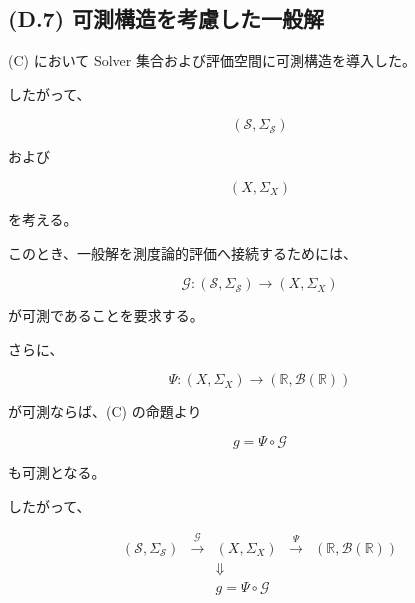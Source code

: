 \documentclass[a4paper,11pt]{article}
\newcommand{\Solver}{\mathcal{S}}
\newcommand{\R}{\mathbb{R}}
\begin{document}
\subsection{(D.7) 可測構造を考慮した一般解}
\label{subsec:D7}

(C) において Solver 集合および評価空間に可測構造を導入した。

したがって、

\begin{equation}
    (\Solver,\Sigma_{\Solver})
\end{equation}

および

\begin{equation}
    (X,\Sigma_X)
\end{equation}

を考える。

このとき、一般解を測度論的評価へ接続するためには、

\begin{equation}
    \mathcal{G}:
    (\Solver,\Sigma_{\Solver})
    \longrightarrow
    (X,\Sigma_X)
\end{equation}

が可測であることを要求する。

さらに、

\begin{equation}
    \Psi:
    (X,\Sigma_X)
    \longrightarrow
    (\R,\mathcal{B}(\R))
\end{equation}

が可測ならば、(C) の命題より

\begin{equation}
    g
    =
    \Psi\circ\mathcal{G}
\end{equation}

も可測となる。

したがって、

\begin{equation}
    \boxed{
    \begin{array}{ccccc}
        (\Solver,\Sigma_{\Solver})
        &\xrightarrow{\mathcal{G}}&
        (X,\Sigma_X)
        &\xrightarrow{\Psi}&
        (\R,\mathcal{B}(\R))
        \\[2mm]
        &&
        \Downarrow
        &&
        \\[-1mm]
        &&
        g=\Psi\circ\mathcal{G}
        &&
    \end{array}
    }
\end{equation}
\end{document}
